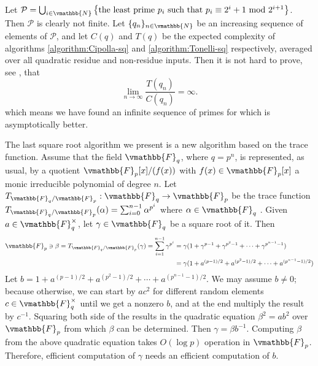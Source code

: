 Let $\mathcal{P} = \bigcup_{i \in \vmathbb{N}}\left\lbrace \text{the least prime } p_i \text{ such 
that } p_i \equiv 2^i + 1 \text{ mod } 2^{i + 1} \right\rbrace$. Then $\mathcal{P}$ is clearly not 
finite. Let $\{q_n\}_{n \in \vmathbb{N}}$ be an increasing sequence of elements of $\mathcal{P}$, and 
let $C(q)$ and $T(q)$ be the expected complexity of algorithms \ref{algorithm:Cipolla-sq} and 
\ref{algorithm:Tonelli-sq} respectively, averaged over all quadratic residue and non-residue inputs. 
Then it is not hard to prove, see \cite{Tornaria2002}, that
$$
\lim_{n \to \infty}\frac{T(q_n)}{C(q_n)} = \infty.
$$
which means we have found an infinite sequence of primes for which 
 is asymptotically better.

The last square root algorithm we present is a new algorithm based on the trace function. Assume 
that the field $\vmathbb{F}_q$, where $q = p^n$, is represented, as usual, by a quotient 
$\vmathbb{F}_p[x] / (f(x))$ with $f(x) \in \vmathbb{F}_p[x]$ a monic irreducible polynomial of degree 
$n$. Let $T_{\vmathbb{F}_q / \vmathbb{F}_p}: \vmathbb{F}_q \rightarrow \vmathbb{F}_p$ be the trace 
function $T_{\vmathbb{F}_q / \vmathbb{F}_p}(\alpha) = \sum_{i = 0}^{n - 1} \alpha^{p^i}$ where $\alpha 
\in \vmathbb{F}_q$ . Given $a \in \vmathbb{F}_q^\times$, let $\gamma \in \vmathbb{F}_q$ be a square 
root of it. Then
\begin{equation}
\label{equation:tr-square}
\begin{aligned}
\vmathbb{F}_p \ni \beta = T_{\vmathbb{F}_q / \vmathbb{F}_p}(\gamma) = \sum_{i = 1}^{n - 1} \gamma^{p^i}
& = \gamma(1 + \gamma^{p - 1} + \gamma^{p^2 - 1} + \cdots + \gamma^{p^{n - 1} -1}) \\
& = \gamma(1 + a^{(p - 1) / 2} + a^{(p^2 - 1) / 2} + \cdots + a^{(p^{n - 1} -1) / 2})
\end{aligned}
\end{equation}
Let $b = 1 + a^{(p - 1) / 2} + a^{(p^2 - 1) / 2} + \cdots + a^{(p^{n - 1} -1) / 2}$. We may assume 
$b \ne 0$; because otherwise,  we can start by $ac^2$ for different random elements $c \in 
\vmathbb{F}_q^\times$ until we get a nonzero $b$, and at the end multiply the result by $c^{-1}$. 
Squaring both side of the  results in the quadratic equation 
$\beta^2 = ab^2$ over $\vmathbb{F}_p$ from which $\beta$ can be determined. Then $\gamma = \beta 
b^{-1}$. Computing $\beta$ from the above quadratic equation takes $O(\log p)$ operation in 
$\vmathbb{F}_p$. Therefore, efficient computation of $\gamma$ needs an efficient computation of $b$. 
